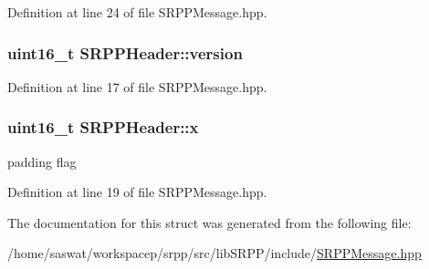 Definition at line 24 of file SRPPMessage.hpp.

\hypertarget{struct_s_r_p_p_header_a1e157a5384ef3d1691a3255b2b85ecc4}{
\subsubsection[{version}]{\setlength{\rightskip}{0pt plus 5cm}uint16\_\-t {\bf SRPPHeader::version}}}
\label{struct_s_r_p_p_header_a1e157a5384ef3d1691a3255b2b85ecc4}


Definition at line 17 of file SRPPMessage.hpp.

\hypertarget{struct_s_r_p_p_header_a4a16f54f96df9130f56a1b9e3f8348fa}{
\subsubsection[{x}]{\setlength{\rightskip}{0pt plus 5cm}uint16\_\-t {\bf SRPPHeader::x}}}
\label{struct_s_r_p_p_header_a4a16f54f96df9130f56a1b9e3f8348fa}
padding flag 

Definition at line 19 of file SRPPMessage.hpp.



The documentation for this struct was generated from the following file:\begin{DoxyCompactItemize}
\item 
/home/saswat/workspacep/srpp/src/libSRPP/include/\hyperlink{_s_r_p_p_message_8hpp}{SRPPMessage.hpp}\end{DoxyCompactItemize}
